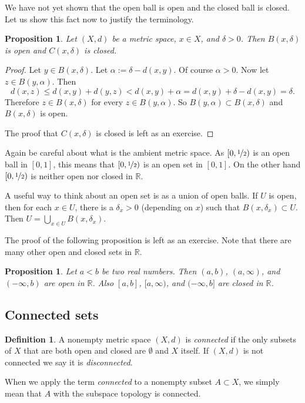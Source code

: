 \documentclass[12pt]{book}
\newcommand{\R}{{\mathbb{R}}}
\newcommand{\myindex}[1]{#1\index{#1}}
\theoremstyle{plain}
\newtheorem{prop}[thm]{Proposition}
\theoremstyle{remark}
\theoremstyle{definition}
\newtheorem{defn}[thm]{Definition}
\theoremstyle{exercise}
\theoremstyle{example}
\begin{document}
We have not yet shown that the open ball is open and the closed ball is
closed.  Let us show this fact now to justify the terminology.

\begin{prop} \label{prop:topology:ballsopenclosed}
Let $(X,d)$ be a metric space, $x \in X$, and $\delta > 0$.  Then
$B(x,\delta)$ is open and 
$C(x,\delta)$ is closed.
\end{prop}

\begin{proof}
Let $y \in B(x,\delta)$.  Let $\alpha := \delta-d(x,y)$.  Of course $\alpha
> 0$.  Now let $z \in B(y,\alpha)$.  Then
\begin{equation*}
d(x,z) \leq d(x,y) + d(y,z) < d(x,y) + \alpha = d(x,y) + \delta-d(x,y) =
\delta .
\end{equation*}
Therefore $z \in B(x,\delta)$ for every $z \in B(y,\alpha)$.  So $B(y,\alpha) \subset B(x,\delta)$ and
$B(x,\delta)$ is open.

The proof that $C(x,\delta)$ is closed is left as an exercise.
\end{proof}

Again be careful about what is the ambient metric space.
As $[0,\nicefrac{1}{2})$ is
an open ball in $[0,1]$, this means that $[0,\nicefrac{1}{2})$ is
an open set in $[0,1]$.  On the other hand $[0,\nicefrac{1}{2})$
is neither open nor closed in $\R$.

A useful way to think about an open set is as a union of open balls.  If $U$ is
open, then for each $x \in U$, there is a $\delta_x > 0$ (depending on $x$) such that
$B(x,\delta_x) \subset U$.  Then $U = \bigcup_{x\in U} B(x,\delta_x)$.

The proof of the following proposition is left as an exercise.  Note that
there are many other open and
closed sets in $\R$.

\begin{prop} \label{prop:topology:intervals:openclosed}
Let $a < b$ be two real numbers.  Then $(a,b)$, $(a,\infty)$,
and $(-\infty,b)$ are open in $\R$.
Also $[a,b]$, $[a,\infty)$,
and $(-\infty,b]$ are closed in $\R$.
\end{prop}


\subsection{Connected sets}

\begin{defn}
A nonempty
metric space $(X,d)$ is \emph{\myindex{connected}} if the
only subsets of $X$ that are both open and closed are $\emptyset$ and $X$ itself.
If $(X,d)$ is not connected we say it is
\emph{\myindex{disconnected}}.

When we apply the term \emph{connected} to a nonempty subset $A \subset X$, we simply
mean that $A$ with the subspace topology is connected.
\end{defn}
\end{document}
